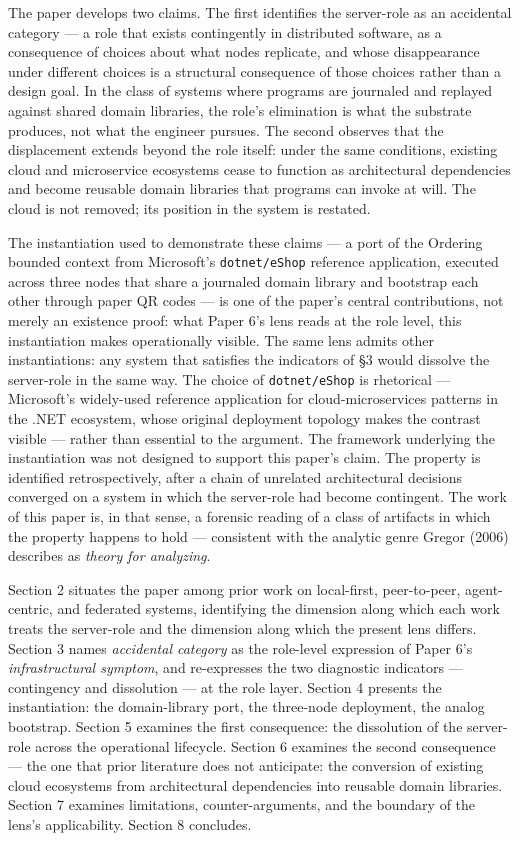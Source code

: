 \documentclass[
]{article}
\begin{document}
The paper develops two claims. The first identifies the server-role as
an accidental category --- a role that exists contingently in
distributed software, as a consequence of choices about what nodes
replicate, and whose disappearance under different choices is a
structural consequence of those choices rather than a design goal. In
the class of systems where programs are journaled and replayed against
shared domain libraries, the role's elimination is what the substrate
produces, not what the engineer pursues. The second observes that the
displacement extends beyond the role itself: under the same conditions,
existing cloud and microservice ecosystems cease to function as
architectural dependencies and become reusable domain libraries that
programs can invoke at will. The cloud is not removed; its position in
the system is restated.

The instantiation used to demonstrate these claims --- a port of the
Ordering bounded context from Microsoft's \texttt{dotnet/eShop}
reference application, executed across three nodes that share a
journaled domain library and bootstrap each other through paper QR codes
--- is one of the paper's central contributions, not merely an existence
proof: what Paper 6's lens reads at the role level, this instantiation
makes operationally visible. The same lens admits other instantiations:
any system that satisfies the indicators of §3 would dissolve the
server-role in the same way. The choice of \texttt{dotnet/eShop} is
rhetorical --- Microsoft's widely-used reference application for
cloud-microservices patterns in the .NET ecosystem, whose original
deployment topology makes the contrast visible --- rather than essential
to the argument. The framework underlying the instantiation was not
designed to support this paper's claim. The property is identified
retrospectively, after a chain of unrelated architectural decisions
converged on a system in which the server-role had become contingent.
The work of this paper is, in that sense, a forensic reading of a class
of artifacts in which the property happens to hold --- consistent with
the analytic genre Gregor (2006) describes as \emph{theory for
analyzing}.

Section 2 situates the paper among prior work on local-first,
peer-to-peer, agent-centric, and federated systems, identifying the
dimension along which each work treats the server-role and the dimension
along which the present lens differs. Section 3 names \emph{accidental
category} as the role-level expression of Paper 6's
\emph{infrastructural symptom}, and re-expresses the two diagnostic
indicators --- contingency and dissolution --- at the role layer.
Section 4 presents the instantiation: the domain-library port, the
three-node deployment, the analog bootstrap. Section 5 examines the
first consequence: the dissolution of the server-role across the
operational lifecycle. Section 6 examines the second consequence --- the
one that prior literature does not anticipate: the conversion of
existing cloud ecosystems from architectural dependencies into reusable
domain libraries. Section 7 examines limitations, counter-arguments, and
the boundary of the lens's applicability. Section 8 concludes.
\end{document}
